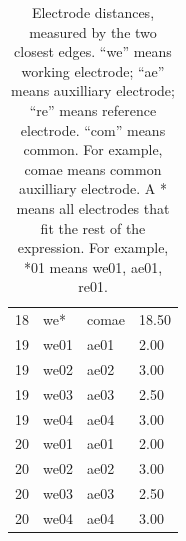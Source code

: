 \begin{table}
\begin{tabular}{llll}
		18 & we* & comae & 18.50 \\
		19 & we01 & ae01 & 2.00 \\
		19 & we02 & ae02 & 3.00 \\
		19 & we03 & ae03 & 2.50 \\
		19 & we04 & ae04 & 3.00 \\
		20 & we01 & ae01 & 2.00 \\
		20 & we02 & ae02 & 3.00 \\
		20 & we03 & ae03 & 2.50 \\
		20 & we04 & ae04 & 3.00
	\end{tabular}
	\caption[Electrode distances.]{Electrode distances, measured by the two closest edges. ``we'' means working electrode; ``ae'' means auxilliary electrode; ``re'' means reference electrode. ``com'' means common. For example, comae means common auxilliary electrode. A * means all electrodes that fit the rest of the expression. For example, *01 means we01, ae01, re01.}
	\label{electrode distance}
\end{table}